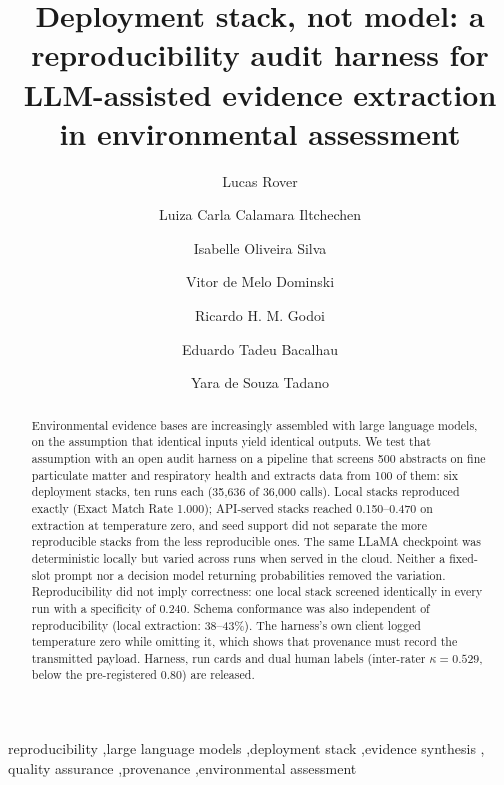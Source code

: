 \documentclass[preprint,review,12pt,authoryear]{elsarticle}
\begin{document}
\begin{frontmatter}

\title{Deployment stack, not model: a reproducibility audit harness for LLM-assisted evidence extraction in environmental assessment}

\author[utfpr]{Lucas Rover}
\author[utfpr]{Luiza Carla Calamara Iltchechen}
\author[ufpr-amb]{Isabelle Oliveira Silva}
\author[descomplica]{Vitor de Melo Dominski}
\author[ufpr-amb]{Ricardo H. M. Godoi}
\author[ufpr-mec]{Eduardo Tadeu Bacalhau}
\author[utfpr]{Yara de Souza Tadano}


\begin{abstract}
Environmental evidence bases are increasingly assembled with large language models, on the assumption that identical inputs yield identical outputs. We test that assumption with an open audit harness on a pipeline that screens 500 abstracts on fine particulate matter and respiratory health and extracts data from 100 of them: six deployment stacks, ten runs each (35{,}636 of 36{,}000 calls). Local stacks reproduced exactly (Exact Match Rate 1.000); API-served stacks reached 0.150--0.470 on extraction at temperature zero, and seed support did not separate the more reproducible stacks from the less reproducible ones. The same LLaMA checkpoint was deterministic locally but varied across runs when served in the cloud. Neither a fixed-slot prompt nor a decision model returning probabilities removed the variation. Reproducibility did not imply correctness: one local stack screened identically in every run with a specificity of 0.240. Schema conformance was also independent of reproducibility (local extraction: 38--43\%). The harness's own client logged temperature zero while omitting it, which shows that provenance must record the transmitted payload. Harness, run cards and dual human labels (inter-rater $\kappa{=}0.529$, below the pre-registered 0.80) are released.
\end{abstract}

\begin{keyword}
reproducibility \sep large language models \sep deployment stack \sep evidence synthesis \sep
quality assurance \sep provenance \sep environmental assessment
\end{keyword}

\end{frontmatter}
\end{document}
